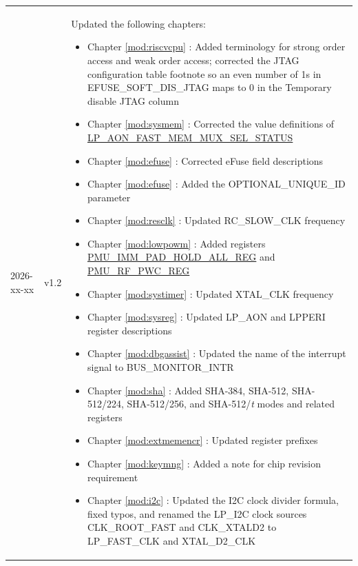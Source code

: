 \begin{longtable}[l]{ | m{2cm} | m{1.5cm} | m{12cm} | }
    2026-xx-xx & v1.2 & Updated the following chapters:
    \begin{itemize}
        \item Chapter \ref{mod:riscvcpu} \textit{\nameref{mod:riscvcpu}}: Added terminology for strong order access and weak order access; corrected the JTAG configuration table footnote so an even number of 1s in EFUSE\_SOFT\_DIS\_JTAG maps to 0 in the Temporary disable JTAG column %
        \item Chapter \ref{mod:sysmem} \textit{\nameref{mod:sysmem}}: Corrected the value definitions of \hyperref[fielddesc:LPAONFASTMEMMUXSELSTATUS]{LP\_AON\_FAST\_MEM\_MUX\_SEL\_STATUS} %
        \item Chapter \ref{mod:efuse} \textit{\nameref{mod:efuse}}: Corrected eFuse field descriptions
        \item Chapter \ref{mod:efuse} \textit{\nameref{mod:efuse}}: Added the OPTIONAL\_UNIQUE\_ID parameter %
        \item Chapter \ref{mod:resclk} \textit{\nameref{mod:resclk}}: Updated RC\_SLOW\_CLK frequency %
        \item Chapter \ref{mod:lowpowm} \textit{\nameref{mod:lowpowm}}: Added registers \hyperref[regdesc:PMUIMMPADHOLDALLREG]{PMU\_IMM\_PAD\_HOLD\_ALL\_REG} and \hyperref[regdesc:PMURFPWCREG]{PMU\_RF\_PWC\_REG}
        \item Chapter \ref{mod:systimer} \textit{\nameref{mod:systimer}}: Updated XTAL\_CLK frequency %
        \item Chapter \ref{mod:sysreg} \textit{\nameref{mod:sysreg}}: Updated LP\_AON and LPPERI register descriptions %
        \item Chapter \ref{mod:dbgassist} \textit{\nameref{mod:dbgassist}}: Updated the name of the interrupt signal to BUS\_MONITOR\_INTR %
        \item Chapter \ref{mod:sha} \textit{\nameref{mod:sha}}: Added SHA-384, SHA-512, SHA-512/224, SHA-512/256, and SHA-512/{\it{t}} modes and related registers
        \item Chapter \ref{mod:extmemencr} \textit{\nameref{mod:extmemencr}}: Updated register prefixes
        \item Chapter \ref{mod:keymng} \textit{\nameref{mod:keymng}}: Added a note for chip revision requirement %
        \item Chapter \ref{mod:i2c} \textit{\nameref{mod:i2c}}: Updated the I2C clock divider formula, fixed typos, and renamed the LP\_I2C clock sources CLK\_ROOT\_FAST and CLK\_XTALD2 to LP\_FAST\_CLK and XTAL\_D2\_CLK %

\end{itemize}
\end{longtable}
